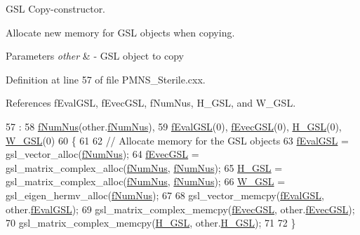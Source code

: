 G\+SL Copy-\/constructor.

Allocate new memory for G\+SL objects when copying.


\begin{DoxyParams}{Parameters}
{\em other} & -\/ G\+SL object to copy \\
\hline
\end{DoxyParams}


Definition at line 57 of file P\+M\+N\+S\+\_\+\+Sterile.\+cxx.



References f\+Eval\+G\+SL, f\+Evec\+G\+SL, f\+Num\+Nus, H\+\_\+\+G\+SL, and W\+\_\+\+G\+SL.


\begin{DoxyCode}
57                                               :
58 \hyperlink{structOscProb_1_1GSL__EinSys_abb8928986203b5904d078f4f4e337a99}{fNumNus}(other.\hyperlink{structOscProb_1_1GSL__EinSys_abb8928986203b5904d078f4f4e337a99}{fNumNus}), 
59 \hyperlink{structOscProb_1_1GSL__EinSys_af69688ebfa983199ae54513628658b4d}{fEvalGSL}(0), \hyperlink{structOscProb_1_1GSL__EinSys_a91ee7084c424d7a92b5001931e036fd6}{fEvecGSL}(0), \hyperlink{structOscProb_1_1GSL__EinSys_a853e4eae015326445776f9ad7e17e513}{H\_GSL}(0), \hyperlink{structOscProb_1_1GSL__EinSys_a366b813a541dcfbaad2ac3d096f31aa1}{W\_GSL}(0)
60 \{
61 
62   \textcolor{comment}{// Allocate memory for the GSL objects}
63   \hyperlink{structOscProb_1_1GSL__EinSys_af69688ebfa983199ae54513628658b4d}{fEvalGSL} = gsl\_vector\_alloc(\hyperlink{structOscProb_1_1GSL__EinSys_abb8928986203b5904d078f4f4e337a99}{fNumNus});
64   \hyperlink{structOscProb_1_1GSL__EinSys_a91ee7084c424d7a92b5001931e036fd6}{fEvecGSL} = gsl\_matrix\_complex\_alloc(\hyperlink{structOscProb_1_1GSL__EinSys_abb8928986203b5904d078f4f4e337a99}{fNumNus}, \hyperlink{structOscProb_1_1GSL__EinSys_abb8928986203b5904d078f4f4e337a99}{fNumNus});
65   \hyperlink{structOscProb_1_1GSL__EinSys_a853e4eae015326445776f9ad7e17e513}{H\_GSL} = gsl\_matrix\_complex\_alloc(\hyperlink{structOscProb_1_1GSL__EinSys_abb8928986203b5904d078f4f4e337a99}{fNumNus}, \hyperlink{structOscProb_1_1GSL__EinSys_abb8928986203b5904d078f4f4e337a99}{fNumNus});
66   \hyperlink{structOscProb_1_1GSL__EinSys_a366b813a541dcfbaad2ac3d096f31aa1}{W\_GSL} = gsl\_eigen\_hermv\_alloc(\hyperlink{structOscProb_1_1GSL__EinSys_abb8928986203b5904d078f4f4e337a99}{fNumNus});
67 
68   gsl\_vector\_memcpy(\hyperlink{structOscProb_1_1GSL__EinSys_af69688ebfa983199ae54513628658b4d}{fEvalGSL}, other.\hyperlink{structOscProb_1_1GSL__EinSys_af69688ebfa983199ae54513628658b4d}{fEvalGSL});
69   gsl\_matrix\_complex\_memcpy(\hyperlink{structOscProb_1_1GSL__EinSys_a91ee7084c424d7a92b5001931e036fd6}{fEvecGSL}, other.\hyperlink{structOscProb_1_1GSL__EinSys_a91ee7084c424d7a92b5001931e036fd6}{fEvecGSL});
70   gsl\_matrix\_complex\_memcpy(\hyperlink{structOscProb_1_1GSL__EinSys_a853e4eae015326445776f9ad7e17e513}{H\_GSL}, other.\hyperlink{structOscProb_1_1GSL__EinSys_a853e4eae015326445776f9ad7e17e513}{H\_GSL});
71 
72 \}
\end{DoxyCode}
